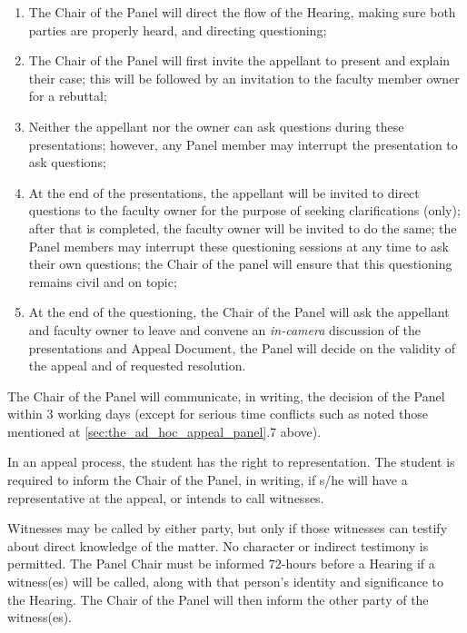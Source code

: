 \begin{enumerate}

\item The Chair of the Panel will direct the flow of the Hearing, making sure
    both parties are properly heard, and directing questioning;

\item The Chair of the Panel will first invite the appellant to present and
    explain their case; this will be followed by an invitation to the faculty
    member owner for a rebuttal;

\item Neither the appellant nor the owner can ask questions during these
    presentations; however, any Panel member may interrupt the presentation to
    ask questions;

\item At the end of the presentations, the appellant will be invited to direct
    questions to the faculty owner for the purpose of seeking clarifications
    (only); after that is completed, the faculty owner will be invited to do
    the same;  the Panel members may interrupt these questioning sessions at
    any time to ask their own questions; the Chair of the panel will ensure
    that this questioning remains civil and on topic;

\item At the end of the questioning, the Chair of the Panel will ask the
    appellant and faculty owner to leave and convene an \emph{in-camera}
    discussion of the presentations and Appeal Document, the Panel will decide
    on the validity of the appeal and of requested resolution.

\end{enumerate}

 The Chair of the Panel will communicate, in writing, the decision of
the Panel within 3 working days (except for serious time conflicts such as
noted those mentioned at \ref{sec:the_ad_hoc_appeal_panel}.7 above).

 In an appeal process, the student has the right to representation.
The student is required to inform the Chair of the Panel, in writing, if s/he
will have a representative at the appeal, or intends to call witnesses. 

 Witnesses may be called by either party, but only if those witnesses
can testify about direct knowledge of the matter.  No character or indirect
testimony is permitted.  The Panel Chair must be informed 72-hours before a
Hearing if a witness(es) will be called, along with that person's identity and
significance to the Hearing.  The Chair of the Panel will then inform the other
party of the witness(es).  

